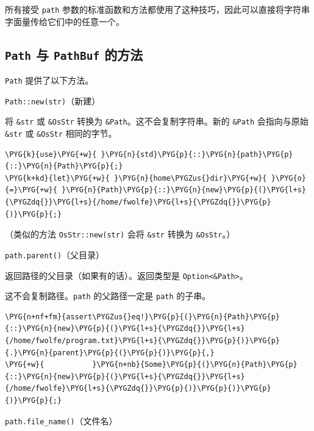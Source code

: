 所有接受 \texttt{path} 参数的标准函数和方法都使用了这种技巧，因此可以直接将字符串字面量传给它们中的任意一个。

\subsection{\texttt{Path} 与 \texttt{PathBuf} 的方法}

\texttt{Path} 提供了以下方法。

\begin{mySidenote}
\texttt{Path::new(str)}（新建）
\end{mySidenote}

将 \texttt{\&str} 或 \texttt{\&OsStr} 转换为 \texttt{\&Path}。这不会复制字符串。新的 \texttt{\&Path} 会指向与原始 \texttt{\&str} 或 \texttt{\&OsStr} 相同的字节。

\begin{Verbatim}[commandchars=\\\{\},breaklines=true,breakanywhere=true,fontsize=\codefont,xleftmargin=17bp]
\PYG{k}{use}\PYG{+w}{ }\PYG{n}{std}\PYG{p}{::}\PYG{n}{path}\PYG{p}{::}\PYG{n}{Path}\PYG{p}{;}
\PYG{k+kd}{let}\PYG{+w}{ }\PYG{n}{home\PYGZus{}dir}\PYG{+w}{ }\PYG{o}{=}\PYG{+w}{ }\PYG{n}{Path}\PYG{p}{::}\PYG{n}{new}\PYG{p}{(}\PYG{l+s}{\PYGZdq{}}\PYG{l+s}{/home/fwolfe}\PYG{l+s}{\PYGZdq{}}\PYG{p}{)}\PYG{p}{;}
\end{Verbatim}

（类似的方法 \texttt{OsStr::new(str)} 会将 \texttt{\&str} 转换为 \texttt{\&OsStr}。）

\texttt{path.parent()}（父目录）

返回路径的父目录（如果有的话）。返回类型是 \texttt{Option<\&Path>}。

这不会复制路径。\texttt{path} 的父路径一定是 \texttt{path} 的子串。

\begin{Verbatim}[commandchars=\\\{\},breaklines=true,breakanywhere=true,fontsize=\codefont,xleftmargin=17bp]
\PYG{n+nf+fm}{assert\PYGZus{}eq!}\PYG{p}{(}\PYG{n}{Path}\PYG{p}{::}\PYG{n}{new}\PYG{p}{(}\PYG{l+s}{\PYGZdq{}}\PYG{l+s}{/home/fwolfe/program.txt}\PYG{l+s}{\PYGZdq{}}\PYG{p}{)}\PYG{p}{.}\PYG{n}{parent}\PYG{p}{(}\PYG{p}{)}\PYG{p}{,}
\PYG{+w}{           }\PYG{n+nb}{Some}\PYG{p}{(}\PYG{n}{Path}\PYG{p}{::}\PYG{n}{new}\PYG{p}{(}\PYG{l+s}{\PYGZdq{}}\PYG{l+s}{/home/fwolfe}\PYG{l+s}{\PYGZdq{}}\PYG{p}{)}\PYG{p}{)}\PYG{p}{)}\PYG{p}{;}
\end{Verbatim}

\begin{mySidenote}
\texttt{path.file\_name()}（文件名）
\end{mySidenote}


